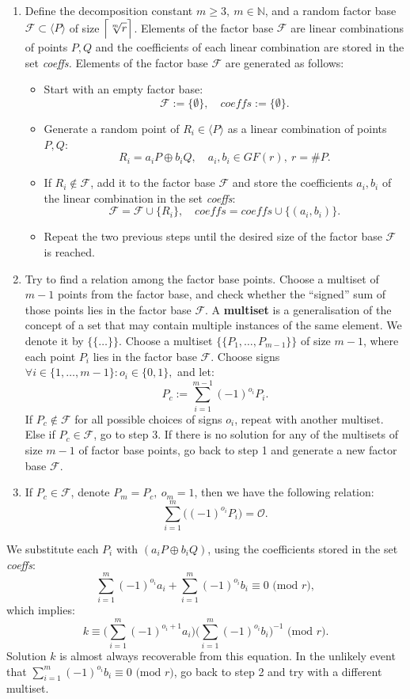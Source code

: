 \documentclass[thesis=M,english]{FITthesis}[2012/10/20]
\theoremstyle{remark}
\theoremstyle{definition}
\begin{document}
\begin{enumerate}
\item Define the decomposition constant $m \geq 3,\ m \in \mathbb{N}$, and a random factor base $\mathcal{F} \subset \langle P \rangle$ of size $\mathlarger{\Big\lceil \sqrt[m]{r} \Big\rceil}$. Elements of the factor base $\mathcal{F}$ are linear combinations of points $P,Q$ and the coefficients of each linear combination are stored in the set \textit{coeffs.} Elements of the factor base $\mathcal{F}$ are generated as follows:
\begin{itemize}
\item Start with an empty factor base:
$$
\mathcal{F} := \{\emptyset \}, \quad \textit{coeffs} := \{\emptyset \}.
$$
\item Generate a random point of $R_i \in \langle P \rangle$ as a linear combination of points $P,Q$:
$$
R_i = a_iP \oplus b_iQ, \quad a_i,b_i \in GF(r),\ r = \#P.
$$
\item If $R_i \not\in \mathcal{F}$, add it to the factor base $\mathcal{F}$ and store the coefficients $a_i,b_i$ of the linear combination in the set \textit{coeffs}:
$$
\mathcal{F} = \mathcal{F} \cup \{R_i\},\quad \textit{coeffs} = \textit{coeffs} \cup \{(a_i, b_i)\}.
$$
\item Repeat the two previous steps until the desired size of the factor base $\mathcal{F}$ is reached.
\end{itemize}
\item Try to find a relation among the factor base points. Choose a multiset of $m-1$ points from the factor base, and check whether the \enquote{signed} sum of those points lies in the factor base $\mathcal{F}$. A \textbf{multiset} is a generalisation of the concept of a set that may contain multiple instances of the same element. We denote it by $\{\{ \ldots \}\}.$
Choose a multiset $\{\{P_1, \ldots, P_{m-1} \}\}$ of size $m-1$, where each point $P_i$ lies in the factor base $\mathcal{F}$. Choose signs $\forall i \in \{1, \ldots, m-1\}: o_i \in \{0,1\},$ and let:
$$
P_c := \sum_{i=1}^{m-1}(-1)^{o_i}P_i.
$$
If $P_c \not\in \mathcal{F}$ for all possible choices of signs $o_i$, repeat with another multiset. Else if $P_c \in \mathcal{F}$, go to step 3. If there is no solution for any of the multisets of size $m-1$ of factor base points, go back to step 1 and generate a new factor base $\mathcal{F}$.
\item If $P_c \in \mathcal{F}$, denote $P_m = P_c,\ o_m = 1$, then we have the following relation:
$$
\sum_{i=1}^{m}\Big((-1)^{o_i}P_i \Big) = \mathcal{O}.
$$
\end{enumerate}
We substitute each $P_i$ with $(a_iP \oplus b_iQ)$, using the coefficients stored in the set \textit{coeffs}:
$$
\sum_{i=1}^m(-1)^{o_i}a_i + \sum_{i=1}^m(-1)^{o_i}b_i \equiv 0 \text{ (mod $r$)}, $$
which implies:
$$
k \equiv \bigg(\sum_{i=1}^m(-1)^{o_i + 1}a_i\bigg)\bigg(\sum_{i=1}^m(-1)^{o_i}b_i\bigg)^{-1} \text{ (mod $r$)}.
$$
Solution $k$ is almost always recoverable from this equation. In the unlikely event that $\sum_{i=1}^m (-1)^{o_i}b_i \equiv 0 \text{ (mod $r$)}$, go back to step 2 and try with a different multiset.
\end{document}
